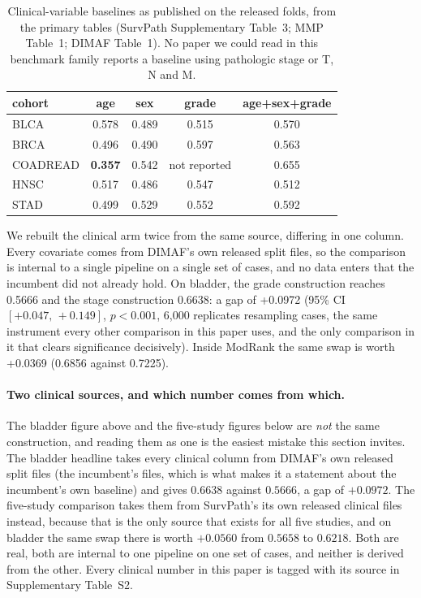 \documentclass[unnumsec,webpdf,contemporary,large]{oup-authoring-template}
\begin{document}
\begin{table}[t]
\centering
\caption{Clinical-variable baselines as published on the released folds, from the primary tables
(SurvPath Supplementary Table~3; MMP Table~1; DIMAF Table~1). No paper we could read in this
benchmark family reports a baseline using pathologic stage or T, N and M.}
\label{tab:published-clinical}
\begin{tabular}{lcccc}
\toprule
cohort & age & sex & grade & age+sex+grade \\
\midrule
BLCA     & 0.578 & 0.489 & 0.515 & 0.570 \\
BRCA     & 0.496 & 0.490 & 0.597 & 0.563 \\
COADREAD & \textbf{0.357} & 0.542 & not reported & 0.655 \\
HNSC     & 0.517 & 0.486 & 0.547 & 0.512 \\
STAD     & 0.499 & 0.529 & 0.552 & 0.592 \\
\bottomrule
\end{tabular}
\end{table}


We rebuilt the clinical arm twice from the same source, differing in one column. Every covariate
comes from DIMAF's own released split files, so the comparison is
internal to a single pipeline on a single set of cases, and no data enters that the incumbent did
not already hold. On bladder, the grade construction reaches 0.5666 and the stage construction
0.6638: a gap of +0.0972 (95\% CI $[+0.047,\,+0.149]$, $p<0.001$, 6{,}000 replicates
resampling cases, the same instrument every other comparison in this paper uses, and the only
comparison in it that clears significance decisively). Inside ModRank the same swap is worth +0.0369
(0.6856 against 0.7225).

\paragraph{Two clinical sources, and which number comes from which.} The bladder figure above and
the five-study figures below are \emph{not} the same construction, and reading them as one is the
easiest mistake this section invites. The bladder headline takes every clinical column from
DIMAF's own released split files (the incumbent's files, which is what makes it a statement about the incumbent's own baseline) and gives $0.6638$ against $0.5666$, a gap of
$+0.0972$. The five-study comparison takes them from SurvPath's
its own released clinical files instead, because that is the only source that exists for all
five studies, and on bladder the same swap there is worth $+0.0560$ from $0.5658$ to $0.6218$.
Both are real, both are internal to one pipeline on one set of cases, and neither is derived from
the other. Every clinical number in this paper is tagged with its source in
Supplementary Table~S2.
\end{document}
